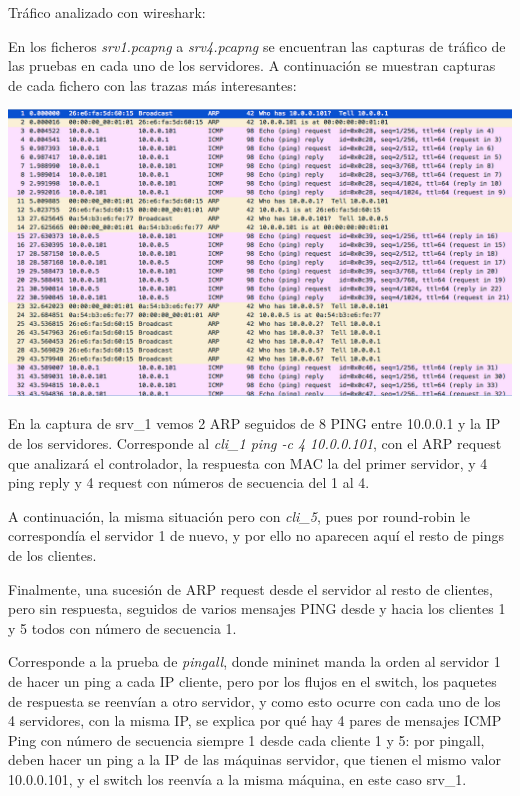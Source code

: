 \documentclass{article}
\begin{document}
Tráfico analizado con wireshark:

\hfil

En los ficheros \textit{srv1.pcapng} a \textit{srv4.pcapng} se encuentran las capturas de tráfico de las pruebas en cada uno de los servidores. A continuación se muestran capturas de cada fichero con las trazas más interesantes:


\begin{center}
	\includegraphics[scale=0.5]{images/srv1.png}
\end{center}

\hfill

En la captura de srv\_1 vemos 2 ARP seguidos de 8 PING entre 10.0.0.1 y la IP de los servidores. Corresponde al \textit{cli\_1 ping -c 4 10.0.0.101}, con el ARP request que analizará el controlador, la respuesta con MAC la del primer servidor, y 4 ping reply y 4 request con números de secuencia del 1 al 4.

A continuación, la misma situación pero con \textit{cli\_5}, pues por round-robin le correspondía el servidor 1 de nuevo, y por ello no aparecen aquí el resto de pings de los clientes.

Finalmente, una sucesión de ARP request desde el servidor al resto de clientes, pero sin respuesta, seguidos de varios mensajes PING desde y hacia los clientes 1 y 5 todos con número de secuencia 1.

Corresponde a la prueba de \textit{pingall}, donde mininet manda la orden al servidor 1 de hacer un ping a cada IP cliente, pero por los flujos en el switch, los paquetes de respuesta se reenvían a otro servidor, y como esto ocurre con cada uno de los 4 servidores, con la misma IP, se explica por qué hay 4 pares de mensajes ICMP Ping con número de secuencia siempre 1 desde cada cliente 1 y 5: por pingall, deben hacer un ping a la IP de las máquinas servidor, que tienen el mismo valor 10.0.0.101, y el switch los reenvía a la misma máquina, en este caso srv\_1.
\end{document}
